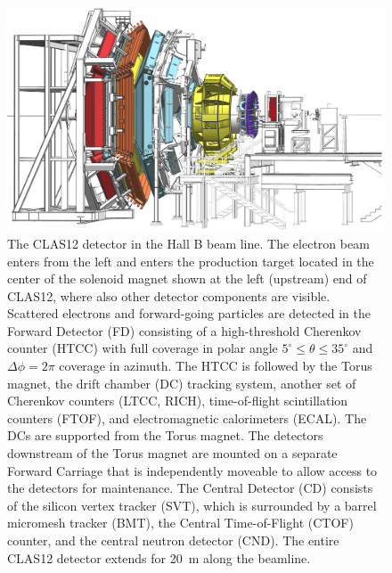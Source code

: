 \documentclass[final,3p,times,twocolumn,authoryear]{elsarticle}
\begin{document}
\begin{figure}[t]
\centering
\centerline{\includegraphics[width=1.8\columnwidth]{CLAS12-side-3.png}}
\caption{\footnotesize The CLAS12 detector in the Hall B beam line. 
 The electron 
beam enters from the left and enters the production target located in the center of the solenoid magnet shown at the left (upstream) end of CLAS12, where also other detector components are visible. Scattered electrons and forward-going particles are detected in the Forward Detector (FD) consisting of a high-threshold 
Cherenkov counter (HTCC) with full coverage in polar angle $5^\circ \le \theta \le 35^\circ$ and $\Delta \phi = 2\pi$ coverage in azimuth. The HTCC is followed by the Torus magnet, the drift chamber (DC) tracking system, another set of Cherenkov counters (LTCC, RICH), time-of-flight scintillation counters (FTOF), and electromagnetic calorimeters (ECAL). The DCs are supported from the Torus magnet. The detectors downstream of the Torus magnet are mounted on a separate Forward Carriage that is independently moveable to allow access to the detectors for maintenance. The 
Central Detector (CD) consists of the silicon vertex tracker (SVT), which is surrounded by a barrel micromesh tracker (BMT), the Central Time-of-Flight (CTOF) counter, and the central neutron detector (CND). 
The entire CLAS12 detector extends for 20~m along the beamline.  } 
\label{clas12}
\end{figure}
\end{document}
